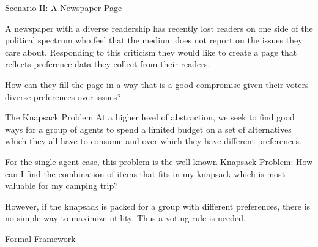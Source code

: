\documentclass{beamer}
\begin{document}
\begin{frame}{Scenario II: A  Newspaper Page}

A newspaper with a diverse readership has recently lost readers on one side of the political spectrum who feel that the medium does not report on the issues they care about. Responding to this criticism they would like to create a page that reflects preference data they collect from their readers.

How can they fill the page in a way that is a good compromise given their voters diverse preferences over issues?
		
\end{frame}

\begin{frame}{The Knapsack Problem}
At a higher level of abstraction, we seek to find good ways for a group of agents to spend a limited budget on a set of alternatives which they all have to consume and over which they have different preferences. 	

For the single agent case, this problem is the well-known Knapsack Problem: How can I find the combination of items that fits in my knapsack which is most valuable for my camping trip?

However, if the knapsack is packed for a group with different preferences, there is no simple way to maximize utility. Thus a voting rule is needed.

\begin{frame}{Formal Framework}
	
\end{frame}

\end{frame}
\end{document}
